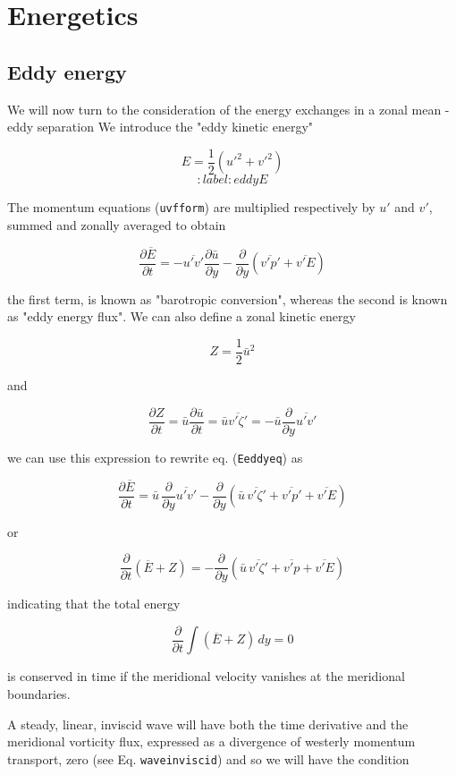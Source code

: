 \section{Energetics}\label{energetics}

\subsection{Eddy energy}\label{eddy-energy}

We will now turn to the consideration of the energy exchanges in a zonal
mean - eddy separation We introduce the "eddy kinetic energy"

\[E = \frac{1}{2}\left( u'^2 + v'^2\right)\]\[:label: eddyE\]

The momentum equations (\texttt{uvfform}) are multiplied respectively by
\(u'\) and \(v'\), summed and zonally averaged to obtain

{\[\frac{\partial \overline{E}}{\partial t} = -\overline{u'v'}\frac{\partial \bar{u}}{\partial y} -\frac{\partial }{\partial y}\left( \overline{v'p'}+\overline{v'E}\right)\]}

the first term, is known as "barotropic conversion", whereas the second
is known as "eddy energy flux". We can also define a zonal kinetic
energy

\[Z =\frac{1}{2}\bar{u}^2\]

and

\[\frac{\partial Z}{\partial t} = \bar{u}\frac{\partial \bar{u}}{\partial t} =\bar{u}\overline{v'\zeta'} = -\bar{u}\frac{\partial }{\partial y}\overline{u'v'}\]

we can use this expression to rewrite eq. (\texttt{Eeddyeq}) as

{\[\frac{\partial \overline{E}}{\partial t} = \bar{u}\,\frac{\partial }{\partial y}\overline{u'v'} -\frac{\partial }{\partial y}\left( \bar{u}\, \overline{v'\zeta'}+ \overline{v'p'}+\overline{v'E}\right)\]}

or

{\[\frac{\partial }{\partial t}\left(\overline{E}+Z\right) =  -\frac{\partial }{\partial y}\left( \bar{u}\, \overline{v'\zeta'}+ \overline{v'p}+\overline{v'E}\right)\]}

indicating that the total energy

{\[\frac{\partial }{\partial t}\int \left(\overline{E}+Z\right) \,  dy =  0\]}

is conserved in time if the meridional velocity vanishes at the
meridional boundaries.

A steady, linear, inviscid wave will have both the time derivative and
the meridional vorticity flux, expressed as a divergence of westerly
momentum transport, zero (see Eq. \texttt{waveinviscid}) and so we will
have the condition

